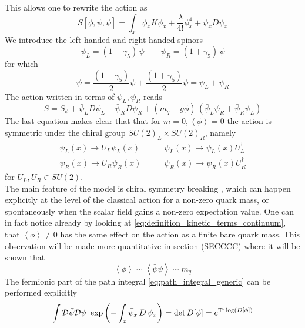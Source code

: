 This allows one to rewrite the action as
\begin{equation*}
    S[\phi,\psi,\bar\psi] = \int_x \phi_x K \phi_x + \frac{\lambda}{4!}\phi_x^4 + \bar\psi_x D \psi_x
\end{equation*}
We introduce the left-handed and right-handed spinors
\begin{equation*}
	\psi_L = (1-\gamma_5) \, \psi \qquad \psi_R = (1+\gamma_5) \, \psi
\end{equation*}
for which
\begin{equation*}
	\psi = \frac{(1-\gamma_5)}{2} \psi + \frac{(1+\gamma_5)}{2} \psi = \psi_L + \psi_R
\end{equation*}
The action written in terms of $\psi_L, \psi_R$ reads
\begin{equation}
	S = S_\phi +  \bar\psi _L D \psi_L + \bar\psi _R D \psi_R + (m_q + g\phi) \,  \left(\bar\psi_L\psi_R + \bar\psi_R\psi_L\right)
	\label{eq:action_chirality_explicit}
\end{equation}
The last equation makes clear that that for $m=0,\left\langle\phi\right\rangle = 0$ the action is symmetric under the chiral group $SU(2) _L\times SU(2)_R$, namely
\begin{equation*}
	\begin{aligned}
		\psi_L(x) \to U_L\psi_L(x) &\qquad \bar\psi_L(x) \to \bar\psi_L(x) U_L^{\dagger} \\
		 \psi_R(x) \to U_R\psi_R(x) &\qquad \bar\psi_R(x) \to \bar\psi_R(x) U_R^{\dagger}
	\end{aligned}
\end{equation*}
for $U_L, U_R \in SU(2)$.\\
The main feature of the model is chiral symmetry breaking \cite{Nambu1961DynamicalI, Nambu1961DynamicalII}, which can happen explicitly at the level of the classical action for a non-zero quark mass, or spontaneously when the scalar field gains a non-zero expectation value. One can in fact notice already by looking at \eqref{eq:definition_kinetic_terms_continuum}, that $\left\langle\phi\right\rangle \neq 0$ has the same effect on the action as a finite bare quark mass. This observation will be made more quantitative in section (SECCCC) where it will be shown that  
\begin{equation*}
    \left\langle \phi \right\rangle \sim \left\langle \bar \psi \psi \right\rangle \sim m_q
\end{equation*}
The fermionic part of the path integral \eqref{eq:path_integral_generic} can be performed explicitly
\begin{equation*}
    \int \mathcal{D} \bar\psi \mathcal{D} \psi \ \exp\left( - \int_x \bar\psi_x \,  D \, \psi_x \right) = \text{det} \, D[\phi] = e^{\operatorname{\text{Tr}} \log (D[\phi])}
\end{equation*}
